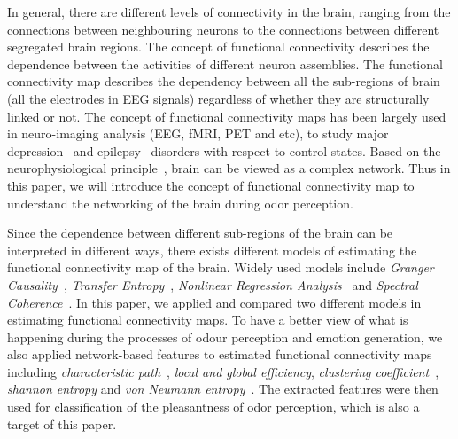 
In general, there are different levels of connectivity in the brain, ranging from the connections between neighbouring neurons to the connections between different segregated brain regions. The concept of functional connectivity describes the dependence between the activities of different neuron assemblies. The functional connectivity map describes the dependency between all the sub-regions of brain (all the electrodes in EEG signals) regardless of whether they are structurally linked or not. The concept of functional connectivity maps has been largely used in neuro-imaging analysis (EEG, fMRI, PET and etc), to study major depression~\cite{greicius2007resting} and epilepsy~\cite{waites2006functional} disorders with respect to control states. Based on the neurophysiological principle~\cite{van2010exploring}, brain can be viewed as a complex network. Thus in this paper, we will introduce the concept of functional connectivity map to understand the networking of the brain during odor perception.

Since the dependence between different sub-regions of the brain can be interpreted in different ways, there exists different models of estimating the functional connectivity map of the brain. Widely used models include \emph{Granger Causality}~\cite{granger1969investigating}, \emph{Transfer Entropy}~\cite{schreiber2000measuring}, \emph{Nonlinear Regression Analysis}~\cite{pijn1990localization} and \emph{Spectral Coherence}~\cite{sun2004measuring}. In this paper, we applied and compared two different models in estimating functional connectivity maps. To have a better view of what is happening during the processes of odour perception and emotion generation, we also applied network-based features to estimated functional connectivity maps including \emph{characteristic path}~\cite{watts1998collective}, \emph{local and global efficiency}, \emph{clustering coefficient}~\cite{latora2001efficient}, \emph{shannon entropy} and \emph{von Neumann entropy}~\cite{passerini2008neumann}. The extracted features were then used for classification of the pleasantness of odor perception, which is also a target of this paper. 

